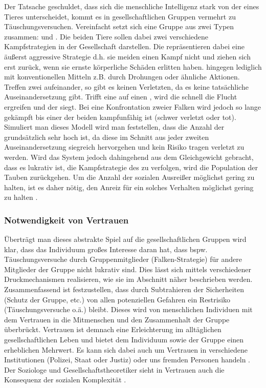 Der Tatsache geschuldet, dass sich die menschliche Intelligenz stark von der eines Tieres unterscheidet, kommt es in gesellschaftlichen Gruppen vermehrt zu Täuschungsversuchen.
Vereinfacht setzt sich eine Gruppe aus zwei Typen zusammen:  und .
Die beiden Tiere sollen dabei zwei verschiedene Kampfstrategien in der Gesellschaft darstellen.
Die  repräsentieren dabei eine äußerst aggressive Strategie d.h. sie meiden einen Kampf nicht und ziehen sich erst zurück, wenn sie ernste körperliche Schäden erlitten haben.
 hingegen  lediglich mit konventionellen Mitteln z.B. durch Drohungen oder ähnliche Aktionen.
Treffen zwei  aufeinander, so gibt es keinen Verletzten, da es keine tatsächliche Auseinandersetzung gibt.
Trifft eine  auf einen , wird die  schnell die Flucht ergreifen und der  siegt.
Bei eine Konfrontation zweier Falken wird jedoch so lange gekämpft bis einer der beiden kampfunfähig ist (schwer verletzt oder tot).
Simuliert man dieses Modell wird man feststellen, dass die Anzahl der  grundsätzlich sehr hoch ist, da diese im Schnitt aus jeder zweiten Auseinandersetzung siegreich hervorgehen und kein Risiko tragen verletzt zu werden.
Wird das System jedoch dahingehend aus dem Gleichgewicht gebracht, dass es lukrativ ist, die Kampfstrategie des  zu verfolgen, wird die Population der Tauben zurückgehen.
Um die Anzahl der sozialen Ausreißer möglichst gering zu halten, ist es daher nötig, den Anreiz für ein solches Verhalten möglichst gering zu halten \citep{tauben-falken}.

\subsubsection{Notwendigkeit von Vertrauen}\label{sec:notwendigkeit-von-vertauen}
Überträgt man dieses abstrakte Spiel auf die gesellschaftlichen Gruppen wird klar, dass das Individuum großes Interesse daran hat, dass bspw. Täuschungsversuche durch Gruppenmitglieder (Falken-Strategie) für andere Mitglieder der Gruppe nicht lukrativ sind.
Dies lässt sich mittels verschiedener Druckmechanismen realisieren, wie sie im Abschnitt  näher beschrieben werden.
Zusammenfassend ist festzustellen, dass durch Subtrahieren der Sicherheiten (Schutz der Gruppe, etc.) von allen potenziellen Gefahren ein Restrisiko (Täuschungsversuche o.ä.) bleibt.
Dieses wird von menschlichen Individuen mit dem Vertrauen in die Mitmenschen und den Zusammenhalt der Gruppe überbrückt.
Vertrauen ist demnach eine Erleichterung im alltäglichen gesellschaftlichen Leben und bietet dem Individuum sowie der Gruppe einen erheblichen Mehrwert.
Es kann sich dabei auch um Vertrauen in verschiedene Institutionen (Polizei, Staat oder Justiz) oder uns fremden Personen handeln \citep{liars-and-outliers}.
Der Soziologe und Gesellschaftstheoretiker  sieht in Vertrauen auch die Konsequenz der sozialen Komplexität \citep{luhmann2000vertrauen}.

